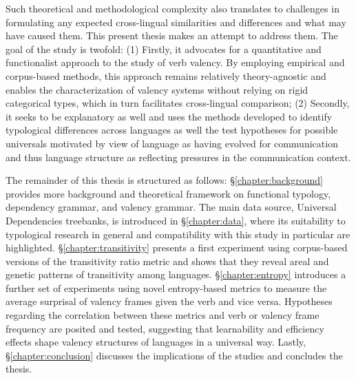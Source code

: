 Such theoretical and methodological complexity also translates to challenges in formulating any expected cross-lingual similarities and differences and what may have caused them. This present thesis makes an attempt to address them. The goal of the study is twofold: (1) Firstly, it advocates for a quantitative and functionalist approach to the study of verb valency. By employing empirical and corpus-based methods, this approach remains relatively theory-agnostic and enables the characterization of valency systems without relying on rigid categorical types, which in turn facilitates cross-lingual comparison; (2) Secondly, it seeks to be explanatory as well and uses the methods developed to identify typological differences across languages as well the test hypotheses for possible universals motivated by view of language as having evolved for communication and thus language structure as reflecting pressures in the communication context.

The remainder of this thesis is structured as follows: §\ref{chapter:background} provides more background and theoretical framework on functional typology, dependency grammar, and valency grammar. The main data source, Universal Dependencies treebanks, is introduced in §\ref{chapter:data}, where its suitability to typological research in general and compatibility with this study in particular are highlighted. §\ref{chapter:transitivity} presents a first experiment using corpus-based versions of the transitivity ratio metric and shows that they reveal areal and genetic patterns of transitivity among languages. §\ref{chapter:entropy} introduces a further set of experiments using novel entropy-based metrics to measure the average surprisal of valency frames given the verb and vice versa. Hypotheses regarding the correlation between these metrics and verb or valency frame frequency are posited and tested, suggesting that learnability and efficiency effects shape valency structures of languages in a universal way. Lastly, §\ref{chapter:conclusion} discusses the implications of the studies and concludes the thesis.